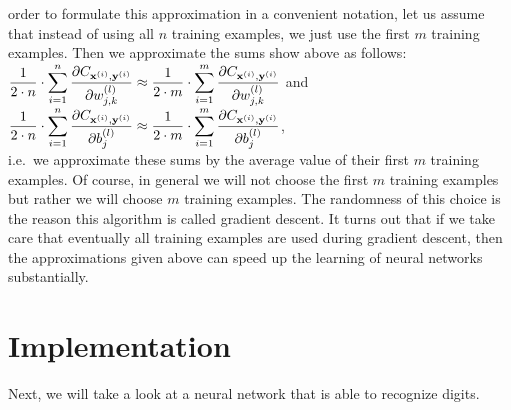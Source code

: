 order to formulate this approximation in a convenient notation, let us assume that instead of using all $n$
training examples, we just use the first $m$ training examples.  Then we approximate the sums show above as follows:
\\[0.2cm]
\hspace*{1.3cm}
$\displaystyle \frac{1}{2\cdot n} \cdot \sum\limits_{i=1}^n \frac{\partial C_{\mathbf{x}^{(i)}, \mathbf{y}^{(i)}}}{\partial w_{j,k}^{(l)}}
 \approx
 \frac{1}{2\cdot m} \cdot \sum\limits_{i=1}^m \frac{\partial C_{\mathbf{x}^{(i)}, \mathbf{y}^{(i)}}}{\partial w_{j,k}^{(l)}}
$
\quad and \quad
$\displaystyle \frac{1}{2\cdot n} \cdot \sum\limits_{i=1}^n \frac{\partial C_{\mathbf{x}^{(i)}, \mathbf{y}^{(i)}}}{\partial b_{j}^{(l)}}
     \approx
     \frac{1}{2\cdot m} \cdot \sum\limits_{i=1}^m \frac{\partial C_{\mathbf{x}^{(i)}, \mathbf{y}^{(i)}}}{\partial b_{j}^{(l)}}
$,
\\[0.2cm]
i.e.~we approximate these sums by the average value of their first $m$ training examples.
Of course, in general we will not choose the first $m$ training examples but rather we will choose $m$ 
training examples.  The randomness of this choice is the reason this algorithm is called 
gradient descent.  It turns out that if we take care that eventually all training examples are used during
gradient descent, then the approximations given above can speed up the learning of neural networks substantially.

\section{Implementation}
Next, we will take a look at a neural network that is able to recognize digits. 

